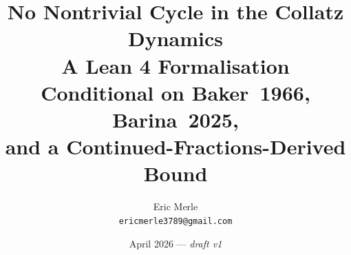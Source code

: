 \documentclass[11pt,a4paper]{article}
\title{%
  No Nontrivial Cycle in the Collatz Dynamics\\
  \large A Lean 4 Formalisation Conditional on Baker~1966, Barina~2025,\\
  and a Continued-Fractions-Derived Bound
}
\author{%
  Eric Merle\\
  \texttt{ericmerle3789@gmail.com}
}
\date{April 2026 --- \emph{draft v1}}
\theoremstyle{definition}
\theoremstyle{remark}
\begin{document}
\maketitle



\tableofcontents
\medskip











\end{document}
